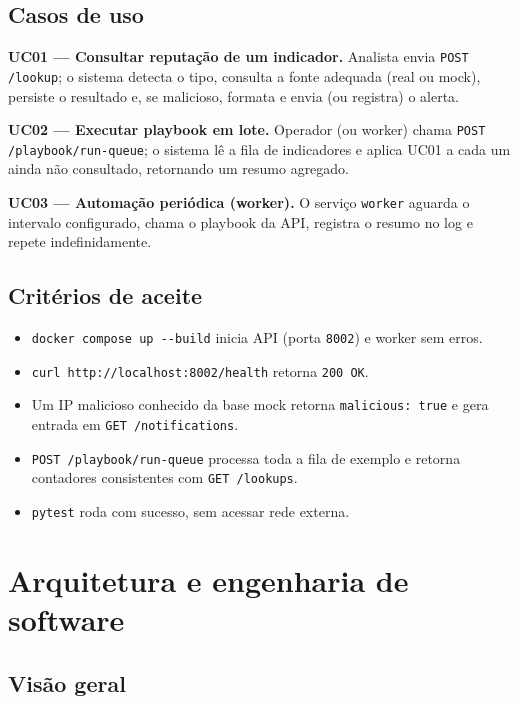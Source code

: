 \documentclass[11pt,a4paper]{article}
\begin{document}
\subsection{Casos de uso}

\textbf{UC01 --- Consultar reputação de um indicador.} Analista envia
\verb|POST /lookup|; o sistema detecta o tipo, consulta a fonte adequada (real ou
mock), persiste o resultado e, se malicioso, formata e envia (ou registra) o alerta.

\textbf{UC02 --- Executar playbook em lote.} Operador (ou worker) chama
\verb|POST /playbook/run-queue|; o sistema lê a fila de indicadores e aplica UC01 a
cada um ainda não consultado, retornando um resumo agregado.

\textbf{UC03 --- Automação periódica (worker).} O serviço \texttt{worker} aguarda o
intervalo configurado, chama o playbook da API, registra o resumo no log e repete
indefinidamente.

\subsection{Critérios de aceite}

\begin{itemize}[nosep]
  \item \verb|docker compose up --build| inicia API (porta \texttt{8002}) e worker sem erros.
  \item \verb|curl http://localhost:8002/health| retorna \texttt{200 OK}.
  \item Um IP malicioso conhecido da base mock retorna \texttt{malicious: true} e gera
  entrada em \texttt{GET /notifications}.
  \item \texttt{POST /playbook/run-queue} processa toda a fila de exemplo e retorna
  contadores consistentes com \texttt{GET /lookups}.
  \item \texttt{pytest} roda com sucesso, sem acessar rede externa.
\end{itemize}

\section{Arquitetura e engenharia de software}
\label{sec:arquitetura}

\subsection{Visão geral}
\end{document}
